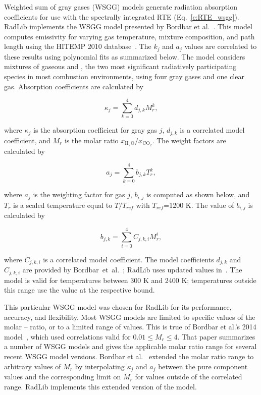 \documentclass[preprint,12pt]{elsarticle}
\begin{document}
    Weighted sum of gray gases (WSGG) models generate radiation absorption coefficients for use with the spectrally
    integrated RTE (Eq.~\ref{e:RTE_wsgg}).
    RadLib implements the WSGG model presented by Bordbar et al.~\citep{Bordbar_2014,Bordbar_2020}. This model
    computes emissivity for varying gas temperature, mixture composition, and path length using the HITEMP 2010
    database~\cite{Rothman_2010}. The $k_j$ and $a_j$ values are correlated to these results using polynomial fits as
    summarized below. The model considers mixtures of gaseous  and , the two most significant
    radiatively participating species in most combustion environments, using four gray gases and one clear gas.
    Absorption coefficients are calculated by
%
    \begin{linenomath}
        \begin{equation}
            \kappa_j=\sum_{k=0}^{4}d_{j,k}M_r^k,
        \end{equation}
    \end{linenomath}
%
    where $\kappa_j$ is the absorption coefficient for gray gas $j$, $d_{j,k}$ is a correlated model coefficient, and
    $M_r$ is the molar ratio $x_{\mathrm{H_2O}}/x_{\mathrm{CO_2}}$. The weight factors are calculated by
%
    \begin{linenomath}
        \begin{equation}
            a_j=\sum_{k=0}^{4}b_{j,k}T_r^k,
        \end{equation}
    \end{linenomath}
%
    where $a_j$ is the weighting factor for gas $j$, $b_{i,j}$ is computed as shown below,  and $T_r$ is a scaled
    temperature equal to $T/T_{ref}$ with $T_{ref}$=1200 K. The value of $b_{i,j}$ is calculated by
%
    \begin{linenomath}
        \begin{equation}
            b_{j,k}=\sum_{i=0}^{4}C_{j,k,i}M_r^i,
        \end{equation}
    \end{linenomath}
%
    where $C_{j,k,i}$ is a correlated model coefficient. The model coefficients $d_{j,k}$ and $C_{j,k,i}$ are
    provided by Bordbar~et~al.~\citep{Bordbar_2014,Bordbar_2020}; RadLib uses updated values
    in~\cite{Bordbar_2020}. The model is valid for temperatures between 300 K and 2400 K; temperatures outside this range use the value at the respective bound.

    This particular WSGG model was chosen for RadLib for its performance, accuracy, and flexibility. Most WSGG models
    are limited to specific values of the molar -- ratio, or to a limited range of values. This is
    true of Bordbar et al.'s 2014 model~\cite{Bordbar_2014}, which used correlations valid for $0.01\le M_r\le4$.
    That paper summarizes a number of WSGG models and gives the applicable molar ratio range for several recent WSGG
    model versions.
    Bordbar et al.~\citep{Bordbar_2020} extended the molar ratio range to arbitrary values of $M_r$ by interpolating
    $\kappa_j$ and $a_j$ between the pure component values and the corresponding limit on $M_r$ for values outside of
    the correlated range. RadLib implements this extended version of the model.
\end{document}
